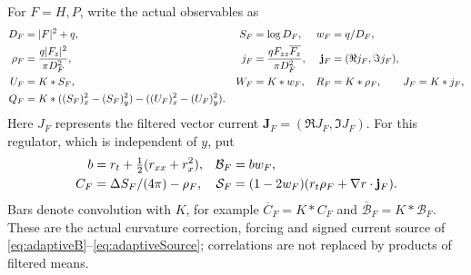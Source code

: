For $F=H,P$, write the actual observables as
\begin{align}
 D_F&=|F|^2+q,& S_F&=\log D_F,& w_F&=q/D_F,\notag\\
 \rho_F&=\frac{q|F_z|^2}{\pi D_F^2},&
 j_F&=\frac{qF_{zz}\overline{F_z}}{\pi D_F^2},&
 \mathbf j_F&=(\Re j_F,\Im j_F),\notag\\
 U_F&=K*S_F,&W_F&=K*w_F,&R_F&=K*\rho_F,\qquad J_F=K*j_F,\notag\\
 Q_F&=K*((S_F)_x^2-(S_F)_y^2)
                    -((U_F)_x^2-(U_F)_y^2).
 \label{eq:positive-actual-observables}
\end{align}
Here $J_F$ represents the filtered vector current
$\mathbf J_F=(\Re J_F,\Im J_F)$.
For this regulator, which is independent of $y$, put
\begin{align}
 b&=r_t+\tfrac12(r_{xx}+r_x^2),&\mathcal B_F&=bw_F,\notag\\
 C_F&=\Delta S_F/(4\pi)-\rho_F,&
 \mathcal S_F&=(1-2w_F)(r_t\rho_F+\nabla r\cdot\mathbf j_F).
 \label{eq:positive-regulator-observables}
\end{align}
Bars denote convolution with $K$, for example
$\overline C_F=K*C_F$ and
$\overline{\mathcal B}_F=K*\mathcal B_F$.
These are the actual curvature correction, forcing and signed current
source of \eqref{eq:adaptiveB}--\eqref{eq:adaptiveSource}; correlations
are not replaced by products of filtered means.

